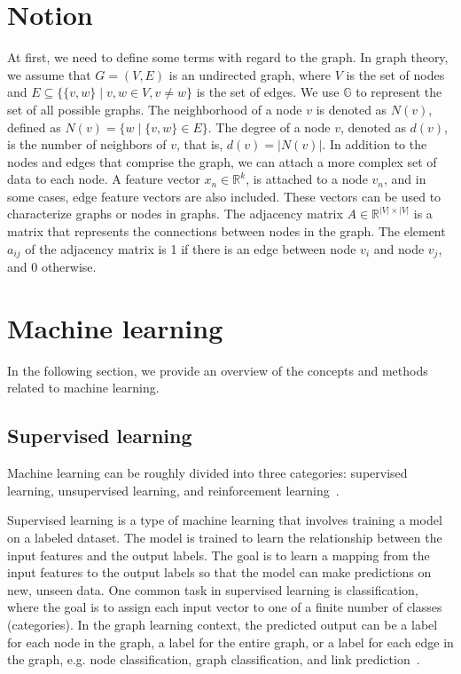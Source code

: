 \section{Notion}
At first, we need to define some terms with regard to the graph. In graph theory, we assume that $G=(V,E)$ is an undirected graph, where $V$ is the set of nodes and $E  \subseteq \{\{v,w\}\mid v,w \in V , v \neq w\}$ is the set of edges. We use $\mathbb{G}$ to represent the set of all possible graphs. The neighborhood of a node $v$ is denoted as $N(v)$, defined as $N(v) = \{w \mid \{v,w\} \in E\}$. The degree of a node $v$, denoted as $d(v)$, is the number of neighbors of $v$, that is, $d(v) = |N(v)|$. In addition to the nodes and edges that comprise the graph, we can attach a more complex set of data to each node.  A feature vector $x_n\in \mathbb{R}^k$, is attached to a node $v_n$, and in some cases, edge feature vectors are also included. These vectors can be used to characterize graphs or nodes in graphs. The adjacency matrix $A \in \mathbb{R}^{|V| \times |V|}$ is a matrix that represents the connections between nodes in the graph. The element $a_{ij}$ of the adjacency matrix is 1 if there is an edge between node $v_i$ and node $v_j$, and 0 otherwise.

\section{Machine learning}
In the following section, we provide an overview of the concepts and methods related to machine learning. 

\subsection{Supervised learning}
Machine learning can be roughly divided into three categories: supervised learning, unsupervised learning, and reinforcement learning~\cite{bishop2006pattern}.

Supervised learning is a type of machine learning that involves training a model on a labeled dataset. The model is trained to learn the relationship between the input features and the output labels. The goal is to learn a mapping from the input features to the output labels so that the model can make predictions on new, unseen data. One common task in supervised learning is classification, where the goal is to assign each input vector to one of a finite number of classes (categories). In the graph learning context, the predicted output can be a label for each node in the graph, a label for the entire graph, or a label for each edge in the graph, e.g. node classification, graph classification, and link prediction~\cite{velivckovic2023everything}.

